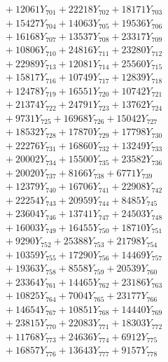 \documentclass[a4paper,10pt]{article}
\begin{document}
{\begin{align}
&\;  + 12061 Y_{701} + 22218 Y_{702} + 18171 Y_{703} \\[0.3ex]
&\;  + 15427 Y_{704} + 14063 Y_{705} + 19536 Y_{706} \\[0.3ex]
&\;  + 16168 Y_{707} + 13537 Y_{708} + 23317 Y_{709} \\[0.3ex]
&\;  + 10806 Y_{710} + 24816 Y_{711} + 23280 Y_{712} \\[0.3ex]
&\;  + 22989 Y_{713} + 12081 Y_{714} + 25560 Y_{715} \\[0.3ex]
&\;  + 15817 Y_{716} + 10749 Y_{717} + 12839 Y_{718} \\[0.5ex]\allowbreak
&\;  + 12478 Y_{719} + 16551 Y_{720} + 10742 Y_{721} \\[0.3ex]
&\;  + 21374 Y_{722} + 24791 Y_{723} + 13762 Y_{724} \\[0.3ex]
&\;  + 9731 Y_{725} + 16968 Y_{726} + 15042 Y_{727} \\[0.3ex]
&\;  + 18532 Y_{728} + 17870 Y_{729} + 17798 Y_{730} \\[0.3ex]
&\;  + 22276 Y_{731} + 16860 Y_{732} + 13249 Y_{733} \\[0.3ex]
&\;  + 20002 Y_{734} + 15500 Y_{735} + 23582 Y_{736} \\[0.3ex]
&\;  + 20020 Y_{737} + 8166 Y_{738} + 6771 Y_{739} \\[0.3ex]
&\;  + 12379 Y_{740} + 16706 Y_{741} + 22908 Y_{742} \\[0.3ex]
&\;  + 22254 Y_{743} + 20959 Y_{744} + 8485 Y_{745} \\[0.3ex]
&\;  + 23604 Y_{746} + 13741 Y_{747} + 24503 Y_{748} \\[0.5ex]\allowbreak
&\;  + 16003 Y_{749} + 16455 Y_{750} + 18710 Y_{751} \\[0.3ex]
&\;  + 9290 Y_{752} + 25388 Y_{753} + 21798 Y_{754} \\[0.3ex]
&\;  + 10359 Y_{755} + 17290 Y_{756} + 14469 Y_{757} \\[0.3ex]
&\;  + 19363 Y_{758} + 8558 Y_{759} + 20539 Y_{760} \\[0.3ex]
&\;  + 23364 Y_{761} + 14465 Y_{762} + 23186 Y_{763} \\[0.3ex]
&\;  + 10825 Y_{764} + 7004 Y_{765} + 23177 Y_{766} \\[0.3ex]
&\;  + 14654 Y_{767} + 10851 Y_{768} + 14440 Y_{769} \\[0.3ex]
&\;  + 23815 Y_{770} + 22083 Y_{771} + 18303 Y_{772} \\[0.3ex]
&\;  + 11768 Y_{773} + 24636 Y_{774} + 6912 Y_{775} \\[0.3ex]
&\;  + 16857 Y_{776} + 13643 Y_{777} + 9157 Y_{778} \\[0.5ex]\allowbreak

\end{align}}
\end{document}
